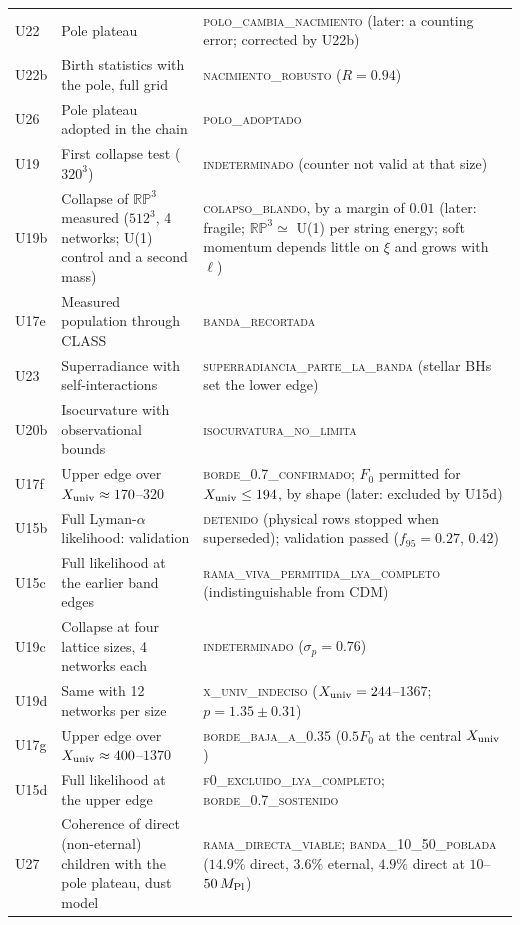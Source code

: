 \documentclass[11pt,a4paper]{article}
\newcommand{\RP}{\mathbb{RP}^3}
\newcommand{\Mpl}{M_{\rm Pl}}
\newcommand{\Xu}{X_{\rm univ}}
\begin{document}
\begin{small}
\begin{longtable}{L{1.3cm}L{6.0cm}L{7.6cm}}
U22 & Pole plateau & \textsc{polo\_cambia\_nacimiento} (later: a counting error; corrected by U22b) \\
U22b & Birth statistics with the pole, full grid & \textsc{nacimiento\_robusto} ($R=0.94$) \\
U26 & Pole plateau adopted in the chain & \textsc{polo\_adoptado} \\
U19 & First collapse test ($320^3$) & \textsc{indeterminado} (counter not valid at that size) \\
U19b & Collapse of $\RP$ measured ($512^3$, 4 networks; U(1) control and a second mass) & \textsc{colapso\_blando}, by a margin of $0.01$ (later: fragile; $\RP\simeq$ U(1) per string energy; soft momentum depends little on $\xi$ and grows with $\ell$) \\
U17e & Measured population through CLASS & \textsc{banda\_recortada} \\
U23 & Superradiance with self-interactions & \textsc{superradiancia\_parte\_la\_banda} (stellar BHs set the lower edge) \\
U20b & Isocurvature with observational bounds & \textsc{isocurvatura\_no\_limita} \\
U17f & Upper edge over $\Xu\approx170$--$320$ & \textsc{borde\_0.7\_confirmado}; $F_0$ permitted for $\Xu\le194$, by shape (later: excluded by U15d) \\
U15b & Full Lyman-$\alpha$ likelihood: validation & \textsc{detenido} (physical rows stopped when superseded); validation passed ($f_{95}=0.27$, $0.42$) \\
U15c & Full likelihood at the earlier band edges & \textsc{rama\_viva\_permitida\_lya\_completo} (indistinguishable from CDM) \\
U19c & Collapse at four lattice sizes, 4 networks each & \textsc{indeterminado} ($\sigma_p=0.76$) \\
U19d & Same with 12 networks per size & \textsc{x\_univ\_indeciso} ($\Xu=244$--$1367$; $p=1.35\pm0.31$) \\
U17g & Upper edge over $\Xu\approx400$--$1370$ & \textsc{borde\_baja\_a\_0.35} ($0.5F_0$ at the central $\Xu$) \\
U15d & Full likelihood at the upper edge & \textsc{f0\_excluido\_lya\_completo}; \textsc{borde\_0.7\_sostenido} \\
U27 & Coherence of direct (non-eternal) children with the pole plateau, dust model & \textsc{rama\_directa\_viable}; \textsc{banda\_10\_50\_poblada} ($14.9\%$ direct, $3.6\%$ eternal, $4.9\%$ direct at $10$--$50\,\Mpl$) \\

\end{longtable}
\end{small}
\end{document}
